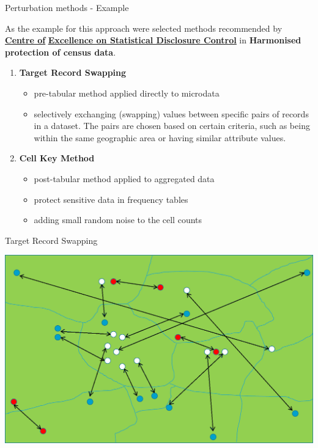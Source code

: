 \documentclass[
	aspectratio = 169
 ]{beamer}
\begin{document}
\begin{frame}{Perturbation methods - Example}

As the example for this approach were selected methods recommended by  
\href{https://cros.ec.europa.eu/coe-sdc}{\color{blue}\underline{\textbf{Centre of}}}
\href{https://cros.ec.europa.eu/coe-sdc}{\color{blue}\underline{\textbf{Excellence on Statistical Disclosure Control}}}
in \textbf{Harmonised protection of census data}.
\vspace{1em}

\begin{enumerate}
    \item \textbf{Target Record Swapping}
        \begin{itemize}
            \normalsize
            \item pre-tabular method applied directly to microdata
            \item selectively exchanging (swapping) values between specific pairs of records in a dataset. The pairs are chosen based on certain criteria, such as being within the same geographic area or having similar attribute values.
        \end{itemize}
    \item \textbf{Cell Key Method}
        \begin{itemize}
            \normalsize
            \item post-tabular method applied to aggregated data
            \item protect sensitive data in frequency tables
            \item adding small random noise to the cell counts
        \end{itemize}
\end{enumerate}

\end{frame}
\begin{frame}{Target Record Swapping}

\centering
\includegraphics[width=0.8\linewidth]{Presentation TEX//gallery/record_swapping.png}

\end{frame}
\end{document}
